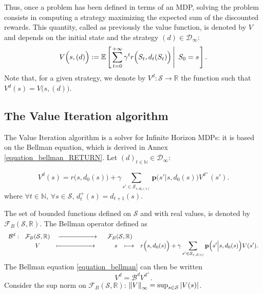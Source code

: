Thus, once a problem has been defined in terms of an MDP,
solving the problem consists in computing a strategy
maximizing the expected sum of the discounted rewards.
This quantity, called as previously the value function,
is denoted by $V$ and depends on the initial state 
and the strategy $(d) \in \mathcal{D}_{\infty}$:
\begin{equation} \label{fctV} 
V\Big(s,(d)\Big) := \mathbb{E} \left[ \left.  \sum_{t=0}^{+\infty} \gamma^{t} r\Big(S_{t},d_t(S_{t})\Big) \, \right| \left. \, S_0=s \right. \right].
\end{equation}
Note that, for a given strategy, 
we denote by $V^d: \mathcal{S} \rightarrow \mathbb{R}$
the function such that $V^d(s)=V\Big(s,(d)\Big)$.
\subsection{The Value Iteration algorithm} \label{resMDP}
The Value Iteration algorithm is a solver for Infinite Horizon MDPs:
it is based on the Bellman equation,
which is derived in Annex \ref{equation_bellman_RETURN}. 
Let $(d)_{t \in \mathbb{N}} \in \mathcal{D}_{\infty}$:
\begin{Def}
\begin{equation}
\label{equation_bellman} V^{d}(s) = r\Big(s,d_0(s)\Big) + \gamma \sum_{s' \in \mathcal{S}_{s,d_0(s)}} \textbf{p} \Big( s' \Big\vert s,d_0(s) \Big) V^{d^+}(s').
\end{equation}
where $\forall t \in \mathbb{N}$, 
$\forall s \in \mathcal{S}$,
$d^+_t(s) = d_{t+1}(s)$. 
\end{Def}

The set of bounded functions defined on $\mathcal{S}$ 
and with real values, is denoted by
$\mathcal{F}_{B}(\mathcal{S},\mathbb{R})$.
The Bellman operator defined as 
\[ \left. \begin{array}{ccccc}
 \mathcal{B}^d: & \mathcal{F}_{B}(\mathcal{S},\mathbb{R}) & \xrightarrow{\hspace*{2cm}} \hspace{0.5cm} \mathcal{F}_{B}(\mathcal{S},\mathbb{R}) & \\
& V & \xmapsto{\hspace*{2cm}} \hspace{1cm}  s \hspace{0.3cm} \longmapsto &  r\Big(s,d_0(s)\Big) + \displaystyle  \gamma  \sum_{s' \in \mathcal{S}_{s,d(s)}}  \textbf{p} \Big( s' \Big\vert s,d_0(s) \Big)  V(s').
\end{array} \right.\] 
The Bellman equation \ref{equation_bellman} can then be written 
\begin{equation}
\label{bellman_equation}
V^d = \mathcal{B}^dV^{d^+}.
\end{equation}
Consider the sup norm on $\mathcal{F}_{B}(\mathcal{S},\mathbb{R})$: 
$\left\lVert V \right\rVert_{\infty} = \sup_{s \in \mathcal{S}} \left\lvert  V(s)  \right\rvert$.


